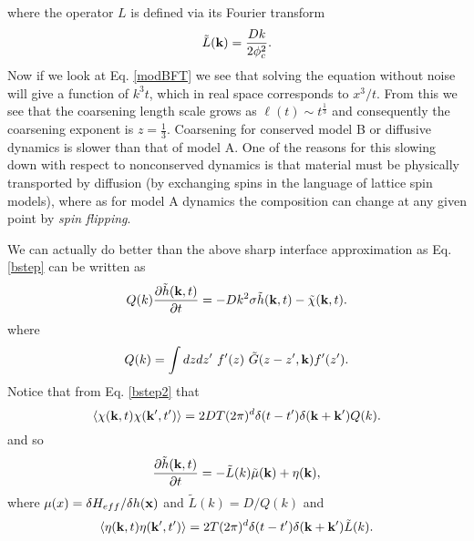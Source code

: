 \documentclass[11pt]{report}
\begin{document}
where the operator $L$ is defined via its Fourier transform
\begin{equation}
\tilde L({\bf k}) = \frac{Dk}{2\phi_c^2}.
\end{equation}
Now if we look at Eq. \eqref{modBFT} we see that solving the equation without noise will give a function of $k^3t$, which in real space corresponds to $x^3/t$. From this we see that the coarsening length scale grows as $\ell(t) \sim t^{\frac{1}{3}}$ and consequently the coarsening exponent is $z=\frac{1}{3}$.  Coarsening for conserved model B or diffusive dynamics is slower than that of model A. One of the reasons for this slowing down with respect to nonconserved dynamics is that material must be physically transported by diffusion (by exchanging spins in the language of lattice spin models), where as for  model A dynamics the composition can change at any given point by {\em spin flipping}.

We can actually do better than the above sharp interface approximation as Eq. \eqref{bstep} can be written as
\begin{equation}
Q(k)\frac{\partial\tilde h({\bf k},t)}{\partial t} = 
-Dk^2\sigma \tilde h({\bf k},t) - \tilde \chi({\bf k},t).\label{bstep2}
\end{equation}
where 
\begin{equation}
Q(k)= \int dzdz' \ f'(z)\ \tilde G(z-z',{\bf k}) f'(z').
\end{equation}
Notice that from Eq. \eqref{bstep2} that
\begin{equation}
\langle \chi({\bf k},t)\chi({\bf k}',t')\rangle  = 2DT(2\pi)^d \delta(t-t') \delta({\bf k}+{\bf k'}) Q(k).\end{equation}
and so 
\begin{equation}
\frac{\partial\tilde h({\bf k},t)}{\partial t}= -\tilde L(k) \tilde \mu({\bf k}) + \eta({\bf k}),
\end{equation}
where $\mu(x)=\delta H_{eff}/\delta h({\bf x}) $ and $\tilde L(k) = D/Q(k)$ and 
\begin{equation}
\langle \eta({\bf k},t)\eta({\bf k}',t')\rangle  = 2T(2\pi)^d \delta(t-t') \delta({\bf k}+{\bf k'}) \tilde L(k).\end{equation}
\end{document}
